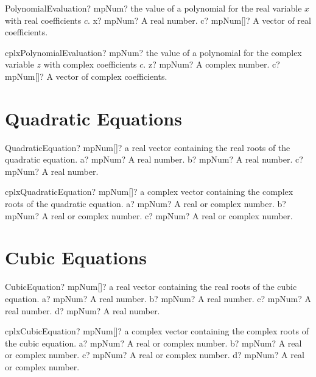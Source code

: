 \documentclass[12pt,a4paper,openany]{book}
\begin{document}
\begin{mpFunctionsExtract}
\mpFunctionTwo
{PolynomialEvaluation? mpNum? the value of a polynomial for the real variable $x$ with real coefficients $c$.}
{x? mpNum? A real number.}
{c? mpNum[]? A vector of real coefficients.}
\end{mpFunctionsExtract}

\begin{mpFunctionsExtract}
\mpFunctionTwo
{cplxPolynomialEvaluation? mpNum? the value of a polynomial for the complex variable $z$ with complex coefficients $c$.}
{z? mpNum? A complex number.}
{c? mpNum[]? A vector of complex coefficients.}
\end{mpFunctionsExtract}

\section{Quadratic Equations}

\begin{mpFunctionsExtract}
\mpFunctionThree
{QuadraticEquation? mpNum[]? a real vector containing the real roots of the quadratic equation.}
{a? mpNum? A real number.}
{b? mpNum? A real number.}
{c? mpNum? A real number.}
\end{mpFunctionsExtract}

\begin{mpFunctionsExtract}
\mpFunctionThree
{cplxQuadraticEquation? mpNum[]? a complex vector containing the complex roots of the quadratic equation.}
{a? mpNum? A real or complex number.}
{b? mpNum? A real or complex number.}
{c? mpNum? A real or complex number.}
\end{mpFunctionsExtract}

\section{Cubic Equations}

\begin{mpFunctionsExtract}
\mpFunctionFour
{CubicEquation? mpNum[]? a real vector containing the real roots of the cubic equation.}
{a? mpNum? A real number.}
{b? mpNum? A real number.}
{c? mpNum? A real number.}
{d? mpNum? A real number.}
\end{mpFunctionsExtract}

\begin{mpFunctionsExtract}
\mpFunctionFour
{cplxCubicEquation? mpNum[]? a complex vector containing the complex roots of the cubic equation.}
{a? mpNum? A real or complex number.}
{b? mpNum? A real or complex number.}
{c? mpNum? A real or complex number.}
{d? mpNum? A real or complex number.}
\end{mpFunctionsExtract}
\end{document}
